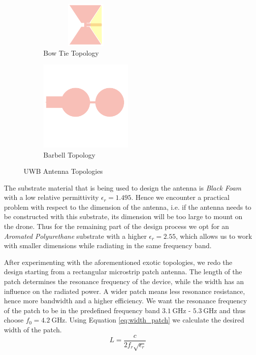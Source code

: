 \documentclass[a4paper]{article}        %
\begin{document}
		\begin{figure}[H]
		\begin{subfigure}{0.5\textwidth}
			\centering
			\includegraphics[width=0.5\textwidth,height=85px]{images/antenna/bow_tie.png}
			\caption{Bow Tie Topology}
		\end{subfigure}
		\begin{subfigure}{0.5\textwidth}
			\centering
			\includegraphics[width=0.5\textwidth]{images/antenna/bar_bell.png}
			\caption{Barbell Topology}
		\end{subfigure}
		\caption{UWB Antenna Topologies}
		\label{fig:topologies}
		\end{figure} 

	The substrate material that is being used to design the antenna is \textit{Black Foam} with a low relative permittivity $\epsilon_r = 1.495$. Hence we encounter a practical problem with respect to the dimension of the antenna, i.e. if the antenna needs to be constructed with this substrate, its dimension will be too large to mount on the drone. Thus for the remaining part of the design process we opt for an \textit{Aromated Polyurethane} substrate with a higher $\epsilon_r = 2.55$, which allows us to work with smaller dimensions while radiating in the same frequency band. 

	After experimenting with the aforementioned exotic topologies, we redo the design starting from a rectangular microstrip patch antenna. The length of the patch determines the resonance frequency of the device, while the width has an influence on the radiated power. A wider patch means less resonance resistance, hence more bandwidth and a higher efficiency. 
	We want the resonance frequency of the patch to be in the predefined frequency band $\SI{3.1}{\giga\hertz}$ - $\SI{5.3}{\giga\hertz}$ and thus choose $f_0 = \SI{4.2}{\giga\hertz}$. Using Equation \eqref{eq:width_patch} we calculate the desired width of the patch.
	\begin{equation} 
	L = \frac{c}{2 f_r \sqrt{\epsilon_r}}
	\label{eq:width_patch}
	\end{equation}
\end{document}
